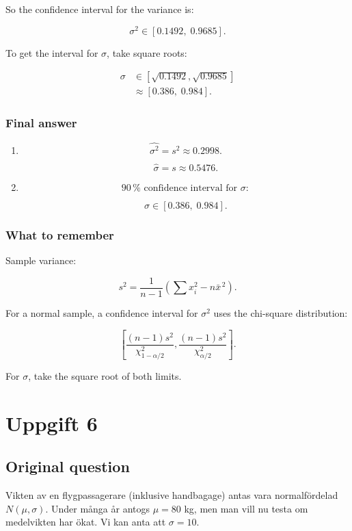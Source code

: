 \documentclass[10pt]{article}
\begin{document}
So the confidence interval for the variance is:

\[
\sigma^2\in [0.1492,\;0.9685].
\]

To get the interval for $\sigma$, take square roots:

\begin{align*}
\sigma
&\in
\left[
\sqrt{0.1492},
\sqrt{0.9685}
\right] \\[2mm]
&\approx
[0.386,\;0.984].
\end{align*}

\subsubsection*{Final answer}
\begin{enumerate}[label=\alph*)]
\item
\[
\widehat{\sigma^2}=s^2\approx 0.2998.
\]

\[
\hat{\sigma}=s\approx 0.5476.
\]

\item
\[
90\,\%\text{ confidence interval for }\sigma:
\]

\[
\sigma\in[0.386,\;0.984].
\]
\end{enumerate}

\subsubsection*{What to remember}
Sample variance:

\[
s^2
=
\frac{1}{n-1}
\left(
\sum x_i^2-n\bar{x}^{\,2}
\right).
\]

For a normal sample, a confidence interval for $\sigma^2$ uses
the chi-square distribution:

\[
\left[
\frac{(n-1)s^2}{\chi^2_{1-\alpha/2}},
\frac{(n-1)s^2}{\chi^2_{\alpha/2}}
\right].
\]

For $\sigma$, take the square root of both limits.

\section*{Uppgift 6}

\subsection*{Original question}
Vikten av en flygpassagerare (inklusive handbagage) antas vara
normalfördelad $N(\mu,\sigma)$. Under många år antogs $\mu=80$ kg,
men man vill nu testa om medelvikten har ökat.
Vi kan anta att $\sigma=10$.
\end{document}
